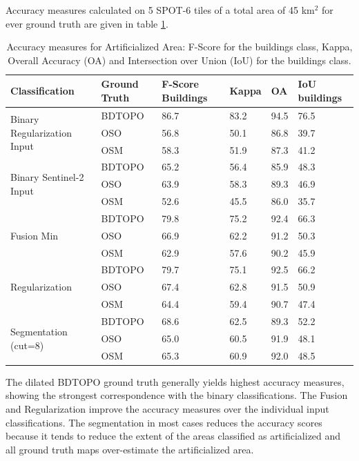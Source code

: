 \documentclass[10pt]{article}
\newcommand{\region}{finistere}
\begin{document}
Accuracy measures calculated on 5 SPOT-6 tiles of a total area of 45 km$^2$ for ever ground truth are given in table \ref{table:accuracy-bin\region}.
\begin{table}[H]
	\centering
	\begin{tabular}{llp{1.5cm}llp{1.5cm}}
		\toprule
		\textbf{Classification} & \textbf{Ground Truth} & \textbf{F-Score Buildings} & \textbf{Kappa} & \textbf{OA} & \textbf{IoU buildings}		\\\hline
		\multirow{3}{*}{Binary Regularization Input}& BDTOPO & 86.7 & 83.2 & 94.5 & 76.5 \\
		& OSO & 56.8 & 50.1 & 86.8 & 39.7 \\
		& OSM & 58.3 & 51.9 & 87.3 & 41.2 \\\hline
		\multirow{3}{*}{Binary Sentinel-2 Input}& BDTOPO & 65.2 & 56.4 & 85.9 & 48.3 \\
		& OSO & 63.9 & 58.3 & 89.3 & 46.9 \\
		& OSM & 52.6 & 45.5 & 86.0 & 35.7 \\\hline
		\multirow{3}{*}{Fusion Min}& BDTOPO & 79.8 & 75.2 & 92.4 & 66.3 \\
		& OSO & 66.9 & 62.2 & 91.2 & 50.3 \\
		& OSM & 62.9 & 57.6 & 90.2 & 45.9 \\\hline
		\multirow{3}{*}{Regularization}& BDTOPO & 79.7 & 75.1 & 92.5 & 66.2 \\
		& OSO & 67.4 & 62.8 & 91.5 & 50.9 \\
		& OSM & 64.4 & 59.4 & 90.7 & 47.4 \\\hline
		\multirow{3}{*}{Segmentation (cut=8)}& BDTOPO & 68.6 & 62.5 & 89.3 & 52.2 \\
		& OSO & 65.0 & 60.5 & 91.9 & 48.1 \\
		& OSM & 65.3 & 60.9 & 92.0 & 48.5 \\\hline
		\bottomrule
	\end{tabular}
	\caption{Accuracy measures for Artificialized Area: F-Score for the buildings class, Kappa, Overall Accuracy (OA) and Intersection over Union (IoU) for the buildings class.}
	\label{table:accuracy-bin\region}
\end{table}
The dilated BDTOPO ground truth generally yields highest accuracy measures, showing the strongest correspondence with the binary classifications. The Fusion and Regularization improve the accuracy measures over the individual input classifications. The segmentation in most cases reduces the accuracy scores because it tends to reduce the extent of the areas classified as artificialized and all ground truth maps over-estimate the artificialized area.
\end{document}
